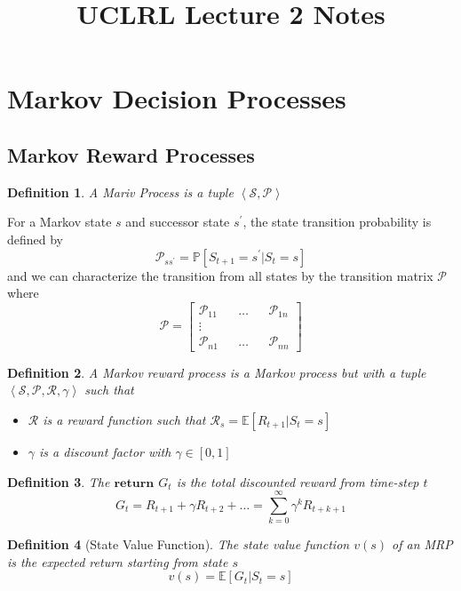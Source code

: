 \documentclass[a4paper,10pt]{article}
\title{UCLRL Lecture 2 Notes}
\author{}
\newtheorem{defn}{Definition}
\begin{document}
\maketitle

\section{Markov Decision Processes}

\subsection{Markov Reward Processes}

\begin{defn}
 A Mariv Process is a tuple $\left< \mathcal{S}, \mathcal{P} \right>$
\end{defn}


For a Markov state $s$ and successor state $s^\prime$, the state transition probability is defined by 
$$
\mathcal{P}_{s s^\prime} = \mathbb{P} \left[ S_{t+1} = s^\prime | S_t = s \right]
$$
and we can characterize the transition from all states by the transition matrix $\mathcal{P}$ where 
$$
\mathcal{P} =
\begin{bmatrix}
 \mathcal{P}_{11} && \ldots && \mathcal{P}_{1n} \\
 \vdots \\
 \mathcal{P}_{n1} && \ldots && \mathcal{P}_{nn} 
\end{bmatrix}
$$

\begin{defn}
 A Markov reward process is a Markov process but with a tuple $\left< \mathcal{S}, \mathcal{P}, \mathcal{R}, \gamma \right>$ such that 
 \begin{itemize}
  \item $\mathcal{R}$ is a reward function such that $\mathcal{R}_s = \mathbb{E} \left[ R_{t+1} | S_t = s \right]$
  \item $\gamma$ is a discount factor with $\gamma \in \left[ 0, 1 \right]$
 \end{itemize}
\end{defn}

\begin{defn}
 The $\bm{return}$ $G_t$ is the total discounted reward from time-step $t$
 $$
 G_t = R_{t+1} + \gamma R_{t+2} + \ldots = \sum_{k=0}^\infty \gamma^k R_{t+k+1}
 $$
\end{defn}

\begin{defn}[State Value Function]
 The state value function $v(s)$ of an MRP is the expected return starting from state $s$
 $$
 v(s) = \mathbb{E} \left[ G_t | S_t = s \right]
 $$
\end{defn}
\end{document}
